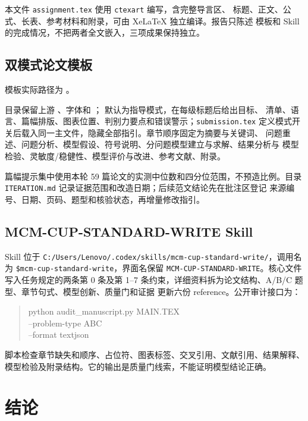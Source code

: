 \documentclass[UTF8,a4paper,12pt]{ctexart}
\begin{document}
{本文件 \texttt{assignment.tex} 使用 \texttt{ctexart} 编写，含完整导言区、
标题、正文、公式、长表、参考材料和附录，可由 XeLaTeX 独立编译。报告只陈述
模板和 Skill 的完成情况，不把两者全文嵌入，三项成果保持独立。

\subsection{双模式论文模板}

模板实际路径为 。\par
目录保留上游
、字体和
； 默认为指导模式，在每级标题后给出目标、
清单、语言、篇幅排版、图表位置、判别力要点和错误警示；\texttt{submission.tex}
定义模式开关后载入同一主文件，隐藏全部指引。章节顺序固定为摘要与关键词、
问题重述、问题分析、模型假设、符号说明、分问题模型建立与求解、结果分析与
模型检验、灵敏度/稳健性、模型评价与改进、参考文献、附录。

篇幅提示集中使用本轮 59 篇论文的实测中位数和四分位范围，不预造比例。目录
\texttt{ITERATION.md} 记录证据范围和改造日期；后续范文结论先在批注区登记
来源编号、日期、页码、题型和核验状态，再增量修改指引。

\subsection{MCM-CUP-STANDARD-WRITE Skill}

Skill 位于
\texttt{C:/Users/Lenovo/.codex/skills/mcm-cup-standard-write/}，调用名为
\texttt{\$mcm-cup-standard-write}，界面名保留
\texttt{MCM-CUP-STANDARD-WRITE}。核心文件写入任务规定的两条第 0 条及第 1--7
条约束，详细资料拆为论文结构、A/B/C 题型、章节句式、模型创新、质量门和证据
更新六份 reference。公开审计接口为：
\begin{quote}
\small\ttfamily
python audit\_manuscript.py MAIN.TEX\\
\hspace*{1em}--problem-type A\textbar B\textbar C\\
\hspace*{1em}--format text\textbar json
\end{quote}
脚本检查章节缺失和顺序、占位符、图表标签、交叉引用、文献引用、结果解释、
模型检验及附录结构。它的输出是质量门线索，不能证明模型结论正确。

\section{结论}

}
\end{document}
